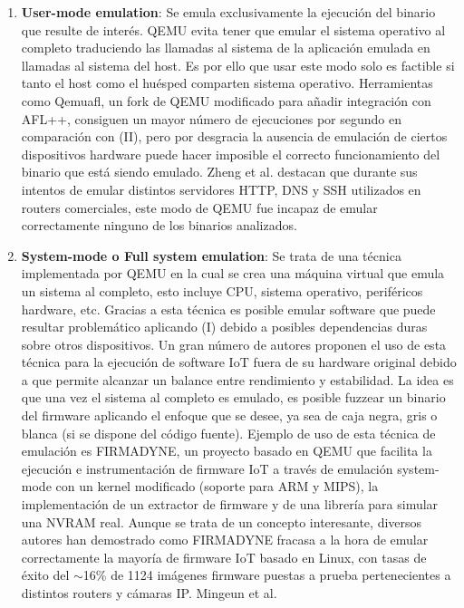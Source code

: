\begin{enumerate}[I]
    \item \textbf{User-mode emulation}: Se emula exclusivamente la ejecución del binario que resulte de interés. QEMU evita tener que emular el sistema 
    operativo al completo traduciendo las llamadas al sistema de la aplicación emulada en llamadas al sistema del host. Es por ello que usar este modo 
    solo es factible si tanto el host como el huésped comparten sistema operativo. Herramientas como Qemuafl\cite{qemuafl}, un fork de QEMU modificado para añadir 
    integración con AFL++, consiguen un mayor número de 
    ejecuciones por segundo en comparación con (II), pero por desgracia la ausencia de emulación de ciertos dispositivos hardware puede hacer imposible 
    el correcto funcionamiento del binario que está siendo emulado. Zheng et al.\cite{Zheng2019} destacan que durante sus intentos de emular distintos 
    servidores HTTP, DNS y SSH utilizados en routers comerciales, este modo de QEMU fue incapaz de emular correctamente ninguno de los binarios analizados.
    \item \textbf{System-mode o Full system emulation}: Se trata de una técnica implementada por QEMU en la cual se crea una máquina virtual que emula un 
    sistema al completo, esto incluye CPU, sistema operativo, periféricos hardware, etc. Gracias a esta técnica es posible emular software que puede resultar 
    problemático aplicando (I) debido a posibles dependencias duras sobre otros dispositivos. Un gran número de autores proponen el uso de esta técnica 
    para la ejecución de software IoT fuera de su hardware original debido a que permite alcanzar un balance entre rendimiento y estabilidad. La idea es que 
    una vez el sistema al completo es emulado, es posible fuzzear un binario del firmware aplicando el enfoque que se desee, ya sea de caja negra, gris o 
    blanca (si se dispone del código fuente). Ejemplo de uso de esta técnica de emulación es FIRMADYNE\cite{Chen2016}, un proyecto basado en QEMU\cite{qemu}
    que facilita la ejecución e instrumentación de firmware IoT a través de emulación system-mode con un kernel modificado (soporte para ARM y MIPS), la 
    implementación de un extractor de firmware y de una librería para simular una NVRAM real. Aunque se trata de un concepto interesante, diversos autores 
    han demostrado como FIRMADYNE\cite{Chen2016} fracasa a la hora de emular correctamente la mayoría de firmware IoT basado en Linux, con tasas de éxito del
    $\sim$16\%\cite{Kim2020} de 1124 imágenes firmware puestas a prueba pertenecientes a distintos routers y cámaras IP. Mingeun et al.\cite{Kim2020} 

\end{enumerate}
